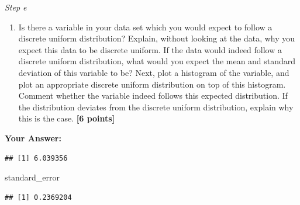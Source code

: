 \documentclass[
]{article}
\newenvironment{Shaded}{\begin{snugshade}}{\end{snugshade}}
\newcommand{\CommentTok}[1]{\textcolor[rgb]{0.56,0.35,0.01}{\textit{#1}}}
\newcommand{\DecValTok}[1]{\textcolor[rgb]{0.00,0.00,0.81}{#1}}
\newcommand{\FunctionTok}[1]{\textcolor[rgb]{0.13,0.29,0.53}{\textbf{#1}}}
\newcommand{\NormalTok}[1]{#1}
\newcommand{\OtherTok}[1]{\textcolor[rgb]{0.56,0.35,0.01}{#1}}
\newcommand{\SpecialCharTok}[1]{\textcolor[rgb]{0.81,0.36,0.00}{\textbf{#1}}}
\providecommand{\tightlist}{%
  \setlength{\itemsep}{0pt}\setlength{\parskip}{0pt}}
\begin{document}
\emph{Step e}

\begin{enumerate}
\def\labelenumi{\arabic{enumi}.}
\setcounter{enumi}{2}
\tightlist
\item
  Is there a variable in your data set which you would expect to follow
  a discrete uniform distribution? Explain, without looking at the data,
  why you expect this data to be discrete uniform. If the data would
  indeed follow a discrete uniform distribution, what would you expect
  the mean and standard deviation of this variable to be? Next, plot a
  histogram of the variable, and plot an appropriate discrete uniform
  distribution on top of this histogram. Comment whether the variable
  indeed follows this expected distribution. If the distribution
  deviates from the discrete uniform distribution, explain why this is
  the case. \textbf{[6 points]}
\end{enumerate}

\textbf{Your Answer:}

\begin{Shaded}
\end{Shaded}

\begin{verbatim}
## [1] 6.039356
\end{verbatim}

\begin{Shaded}
\begin{Highlighting}[]
\NormalTok{standard\_error}
\end{Highlighting}
\end{Shaded}

\begin{verbatim}
## [1] 0.2369204
\end{verbatim}
\end{document}
